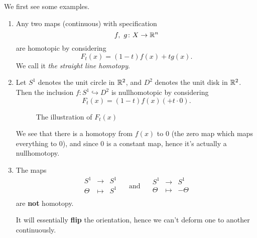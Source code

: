 \begin{eg}
	We first see some examples.
	\begin{enumerate}
		\item Any two maps (continuous) with specification
		      \[
			      f,\ g\colon X\to \mathbb{\MakeUppercase{R}}^n
		      \]
		      are homotopic by considering
		      \[
			      F_{t}(x) = (1 - t)f(x) + t g(x).
		      \]
		      We call it \emph{the straight line homotopy}.
		\item Let \(S^1\) denotes the unit circle in \(\mathbb{\MakeUppercase{R}} ^2\), and
		      \(D^2\)  denotes the unit disk in \(\mathbb{\MakeUppercase{R}} ^2\). Then the inclusion
		      \(f\colon S^1\hookrightarrow D^2\) is nullhomotopic by considering
		      \[
			      F_t(x) = (1 - t)f(x) ( + t\cdot 0).
		      \]
		      \begin{figure}[H]
			      \centering
			      \caption{The illustration of \(F_{t}(x)\)}
			      \label{fig:eg:homotopy}
		      \end{figure}
		      We see that there is a homotopy from \(f(x)\) to \(0\) (the zero map which maps everything to \(0\)), and since \(0\) is a constant map, hence it's actually
		      a nullhomotopy.
		\item The maps
		      \[
			      \begin{array}{ccc}
				      S^1    & \to     & S^1 \\
				      \Theta & \mapsto & S^1 \\
			      \end{array}\quad \text{ and } \quad
			      \begin{array}{ccc}
				      S^1    & \to     & S^1     \\
				      \Theta & \mapsto & -\Theta \\
			      \end{array}
		      \]
		      are \textbf{not} homotopy.
		      \begin{remark}
			      It will essentially \textbf{flip} the orientation, hence we can't deform one to another continuously.
		      \end{remark}
	\end{enumerate}
\end{eg}

